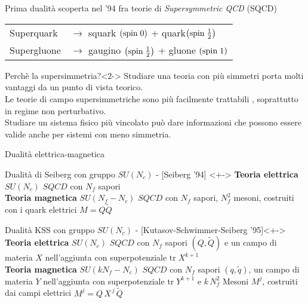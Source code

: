 \documentclass[10pt,compress]{beamer}
\begin{document}
\begin{frame}
Prima dualità scoperta nel '94 fra teorie di \emph{Supersymmetric QCD} (SQCD)
\begin{table}
\begin{tabular}{l l}
Superquark \quad & $\longrightarrow$ \quad squark $\left( \hbox{spin} \;  0 \right)$ + quark$\left (\hbox{spin} \;  \frac{1}{2} \right)$ \\
Supergluone \quad &  $\longrightarrow$ \quad gaugino $\left (\hbox{spin} \;  \frac{1}{2} \right)$ + gluone  $\left( \hbox{spin} \;  1 \right)$ \\
\end{tabular}
\end{table}

\begin{block}{Perchè la supersimmetria?}<2->
Studiare una teoria con più simmetri porta molti vantaggi da un punto di vista teorico.\\
\vspace{0.3cm}
Le teorie di campo supersimmetriche sono più facilmente trattabili , soprattutto in regime \alert{non perturbativo}.\\
\vspace{0.3cm}
Studiare un sistema fisico più vincolato può dare \alert{informazioni} che possono essere valide anche per sistemi \alert{con meno simmetria}.  
\end{block}


\end{frame}



\begin{frame}{Dualità elettrica-magnetica}

\begin{block}{Dualità di Seiberg con gruppo $SU(N_c)$ - [Seiberg '94] }<+->
{\bfseries  Teoria elettrica}  \quad $SU(N_c)$  $SQCD$ con $N_f$ sapori \\[0.1cm]
{\bfseries   Teoria magnetica} \quad   $SU(N_f - N_c)$  $SQCD$ con $N_f$ sapori,  $N_f^2$  mesoni,   costruiti con i quark elettrici $M = Q\tilde{Q}$\\
\end{block}

\vspace{0.5cm}


\begin{block}{Dualità KSS con gruppo $SU(N_c)$ - [Kutasov-Schwimmer-Seiberg '95]}<+->
{\bfseries  Teoria elettrica}  \quad $SU(N_c)$  $SQCD$ con $N_f$ sapori $(Q,\tilde{Q})$ e un campo di materia $X$ nell'aggiunta con superpotenziale $\mathrm{tr} \; X^{k+1}$\\[0.1cm]
{\bfseries  Teoria magnetica}  \quad $SU(k N_f - N_c)$  $SQCD$ con $N_f$ sapori $(q,\tilde{q})$, un campo di materia $Y$ nell'aggiunta con superpotenziale $\mathrm{tr}\; Y^{k+1}$ e  $ k \, N_f^2$  Mesoni $M^j$, costruiti dai campi elettrici $M^j = Q \, X^{\,j} \, \tilde{Q}$\\
\end{block}
\vfill 
\end{frame}
\end{document}
